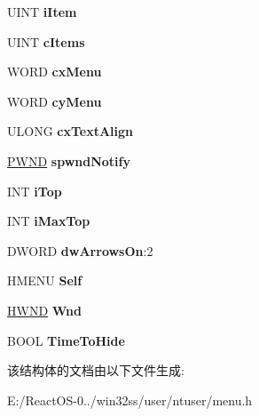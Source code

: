 \begin{DoxyCompactItemize}
\mbox{\label{structtag_r_o_s_m_e_n_u_i_n_f_o_a3d5843bdb261245e4017df8e86a7dc87}} 
U\+I\+NT {\bfseries i\+Item}
\item 
\mbox{\label{structtag_r_o_s_m_e_n_u_i_n_f_o_a37a2b25cbd00b408277e3ce82f32c9f0}} 
U\+I\+NT {\bfseries c\+Items}
\item 
\mbox{\label{structtag_r_o_s_m_e_n_u_i_n_f_o_ade265774b6df889f8239bb05c2203303}} 
W\+O\+RD {\bfseries cx\+Menu}
\item 
\mbox{\label{structtag_r_o_s_m_e_n_u_i_n_f_o_ac540c855da40677e907c3ab7c119ca4f}} 
W\+O\+RD {\bfseries cy\+Menu}
\item 
\mbox{\label{structtag_r_o_s_m_e_n_u_i_n_f_o_a70bd51b92d6bef42b8a97cf8386eabbb}} 
U\+L\+O\+NG {\bfseries cx\+Text\+Align}
\item 
\mbox{\label{structtag_r_o_s_m_e_n_u_i_n_f_o_ab11ebf9df68d51e298f70b7eda1c865e}} 
\hyperlink{struct___w_n_d}{P\+W\+ND} {\bfseries spwnd\+Notify}
\item 
\mbox{\label{structtag_r_o_s_m_e_n_u_i_n_f_o_a1cecb9cd647399112c0f7af2b245c62c}} 
I\+NT {\bfseries i\+Top}
\item 
\mbox{\label{structtag_r_o_s_m_e_n_u_i_n_f_o_a282c603b20360497b3b9f6ccffc9a72f}} 
I\+NT {\bfseries i\+Max\+Top}
\item 
\mbox{\label{structtag_r_o_s_m_e_n_u_i_n_f_o_ae058591af18644a4eb664d7d750dac29}} 
D\+W\+O\+RD {\bfseries dw\+Arrows\+On}\+:2
\item 
\mbox{\label{structtag_r_o_s_m_e_n_u_i_n_f_o_a2ef73530abac54cefa66e56fd845d6c9}} 
H\+M\+E\+NU {\bfseries Self}
\item 
\mbox{\label{structtag_r_o_s_m_e_n_u_i_n_f_o_a5a3e53d975656acef45ad16683d56353}} 
\hyperlink{interfacevoid}{H\+W\+ND} {\bfseries Wnd}
\item 
\mbox{\label{structtag_r_o_s_m_e_n_u_i_n_f_o_a9bbc2c922e8cb1b7be1ad6a0ff1e99c2}} 
B\+O\+OL {\bfseries Time\+To\+Hide}
\end{DoxyCompactItemize}


该结构体的文档由以下文件生成\+:\begin{DoxyCompactItemize}
\item 
E\+:/\+React\+O\+S-\/0../win32ss/user/ntuser/menu.\+h\end{DoxyCompactItemize}
